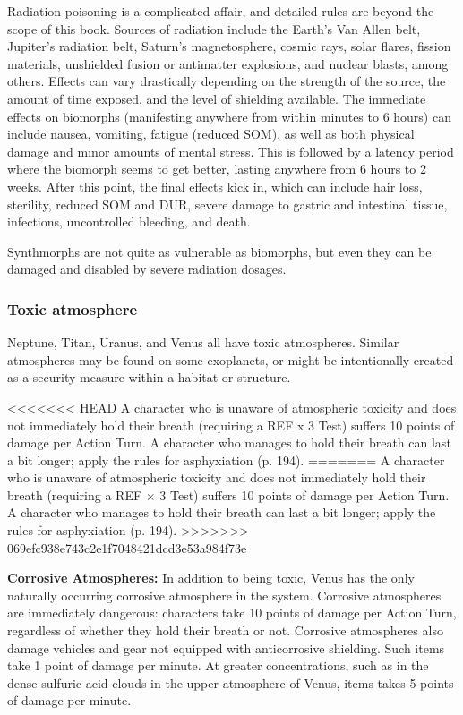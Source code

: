 Radiation poisoning is a complicated affair, and detailed rules are beyond the scope of this book. Sources of radiation include the Earth’s Van Allen belt, Jupiter’s radiation belt, Saturn’s magnetosphere, cosmic rays, solar flares, fission materials, unshielded fusion or antimatter explosions, and nuclear blasts, among others. Effects can vary drastically depending on the strength of the source, the amount of time exposed, and the level of shielding available. The immediate effects on biomorphs (manifesting anywhere from within minutes to 6 hours) can include nausea, vomiting, fatigue (reduced SOM), as well as both physical damage and minor amounts of mental stress. This is followed by a latency period where the biomorph seems to get better, lasting anywhere from 6 hours to 2 weeks. After this point, the final effects kick in, which can include hair loss, sterility, reduced SOM and DUR, severe damage to gastric and intestinal tissue, infections, uncontrolled bleeding, and death.

Synthmorphs are not quite as vulnerable as biomorphs, but even they can be damaged and disabled by severe radiation dosages.

\subsubsection{Toxic atmosphere}

Neptune, Titan, Uranus, and Venus all have toxic atmospheres. Similar atmospheres may be found on some exoplanets, or might be intentionally created as a security measure within a habitat or structure.

<<<<<<< HEAD
A character who is unaware of atmospheric toxicity and does not immediately hold their breath (requiring a REF x 3 Test) suffers 10 points of damage per Action Turn. A character who manages to hold their breath can last a bit longer; apply the rules for asphyxiation (p. 194).
=======
A character who is unaware of atmospheric toxicity and does not immediately hold their breath (requiring a REF $\times$ 3 Test) suffers 10 points of damage per Action Turn. A character who manages to hold their breath can last a bit longer; apply the rules for asphyxiation (p. 194).
>>>>>>> 069efc938e743c2e1f7048421dcd3e53a984f73e

\textbf{Corrosive Atmospheres:} In addition to being toxic, Venus has the only naturally occurring corrosive atmosphere in the system. Corrosive atmospheres are immediately dangerous: characters take 10 points of damage per Action Turn, regardless of whether they hold their breath or not. Corrosive atmospheres also damage vehicles and gear not equipped with anticorrosive shielding. Such items take 1 point of damage per minute. At greater concentrations, such as in the dense sulfuric acid clouds in the upper atmosphere of Venus, items takes 5 points of damage per minute.

